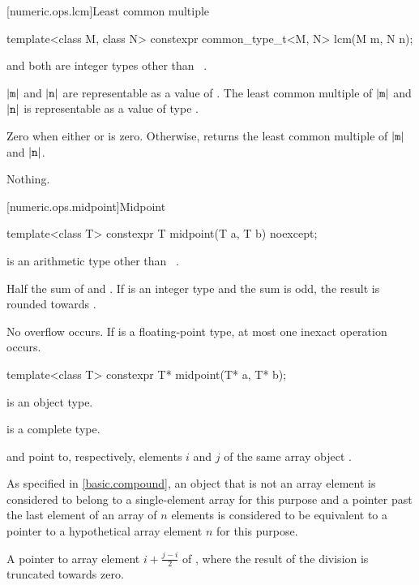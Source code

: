 [numeric.ops.lcm]{Least common multiple}

%
\begin{itemdecl}
template<class M, class N>
  constexpr common_type_t<M, N> lcm(M m, N n);
\end{itemdecl}

\begin{itemdescr}
\pnum
\mandates
{} and  both are integer types other than
\cv{}~.

\pnum
\expects
$|\tcode{m}|$ and $|\tcode{n}|$
are representable as a value of .
The least common multiple of $|\tcode{m}|$ and $|\tcode{n}|$
is representable as a value of type .

\pnum
\returns
Zero when either  or  is zero.
Otherwise, returns the least common multiple of $|\tcode{m}|$ and $|\tcode{n}|$.

\pnum
\throws
Nothing.
\end{itemdescr}

[numeric.ops.midpoint]{Midpoint}

%
\begin{itemdecl}
template<class T>
  constexpr T midpoint(T a, T b) noexcept;
\end{itemdecl}
\begin{itemdescr}
\pnum
\constraints
{} is an arithmetic type other than \cv{}~.

\pnum
\returns
Half the sum of  and .
If  is an integer type and the sum is odd,
the result is rounded towards .

\pnum
\remarks
No overflow occurs.
If  is a floating-point type, at most one inexact operation occurs.
\end{itemdescr}

%
\begin{itemdecl}
template<class T>
  constexpr T* midpoint(T* a, T* b);
\end{itemdecl}
\begin{itemdescr}
\pnum
\constraints
{} is an object type.

\pnum
\mandates
{} is a complete type.

\pnum
\expects
{} and  point to, respectively,
elements $i$ and $j$ of the same array object .
\begin{note}
As specified in \ref{basic.compound},
an object that is not an array element
is considered to belong to a single-element array for this purpose and
a pointer past the last element of an array of $n$ elements
is considered to be equivalent to a pointer
to a hypothetical array element $n$ for this purpose.
\end{note}

\pnum
\returns
A pointer to array element $i+\frac{j-i}{2}$ of ,
where the result of the division is truncated towards zero.
\end{itemdescr}

